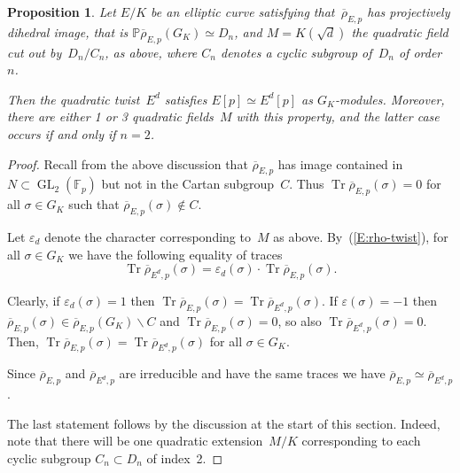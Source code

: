 \documentclass[12pt]{amsart}
\newcommand{\F}{\mathbb{F}}
\newcommand{\PP}{\mathbb{P}}
\newcommand{\rhobar}{{\overline{\rho}}}
\newcommand{\eps}{\varepsilon}
\DeclareMathOperator{\Tr}{Tr}
\newcommand{\GL}{\operatorname{GL}}
\numberwithin{equation}{section}
\newtheorem{proposition}[theorem]{Proposition}
\theoremstyle{definition}
\theoremstyle{remark}
\begin{document}
\begin{proposition} \label{P:twistNumber}
Let $E/K$ be an elliptic curve satisfying that~$\rhobar_{E,p}$ has
projectively dihedral image, that is $\PP \rhobar_{E,p} (G_K) \simeq
D_{n}$, and $M=K(\sqrt{d})$ the quadratic field cut out by~$D_n/C_n$,
as above, where $C_n$ denotes a cyclic subgroup of~$D_n$ of order~$n$.

Then the quadratic twist~$E^d$ satisfies $E[p] \simeq E^d[p]$ as
$G_K$-modules.  Moreover, there are either 1 or 3 quadratic
fields~$M$ with this property, and the latter case occurs if and only
if $n=2$.
\end{proposition}
\begin{proof} 
Recall from the above discussion that 
$\rhobar_{E,p}$ has image contained in $N \subset \GL_2(\F_p)$ but not in the Cartan subgroup~$C$. Thus $\Tr \rhobar_{E,p}(\sigma) = 0$ for all $\sigma \in G_K$ such that $\rhobar_{E,p}(\sigma) \not\in C$. 

Let $\eps_d$ denote the character corresponding to~$M$ as above.
By~(\ref{E:rho-twist}), for all $\sigma \in G_K$ we have the following
equality of traces
\[\Tr \rhobar_{{E^d},p}(\sigma) = \eps_d(\sigma) \cdot \Tr \rhobar_{E,p}(\sigma).\]

Clearly, if $\eps_d(\sigma)=1$ then $\Tr \rhobar_{E,p}(\sigma) = \Tr \rhobar_{E^d,p}(\sigma)$. 
If $\eps(\sigma) = -1$ then $\rhobar_{E,p}(\sigma) \in \rhobar_{E,p} (G_K) \backslash C$ and $\Tr \rhobar_{E,p}(\sigma) = 0$, so also $\Tr \rhobar_{E^d,p}(\sigma) = 0$.
Then, $\Tr \rhobar_{E,p}(\sigma) = \Tr \rhobar_{E^d,p}(\sigma)$ 
for all $\sigma \in G_K$. 

Since $\rhobar_{E,p}$ and $\rhobar_{E^d,p}$ are irreducible and have
the same traces we have $\rhobar_{E,p} \simeq \rhobar_{E^d,p}$.

The last statement follows by the discussion at the start of this
section. Indeed, note that there will be one quadratic extension~$M/K$
corresponding to each cyclic subgroup $C_n \subset D_{n}$ of index~2.
\end{proof}
\end{document}
